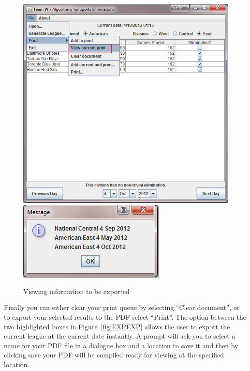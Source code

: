 \begin{figure}
\includegraphics[width=\linewidth,height=\measurepage,keepaspectratio]{images/userManualDesk11.png}
\includegraphics{images/userManualDesk12.png}
\caption{Viewing information to be exported}\label{fig:EXPVIEW}
\end{figure}

Finally you can either clear your print queue by selecting ``Clear document'', or
to export your selected results to the PDF select ``Print''. The
option between the two highlighted boxes in Figure~\ref{fig:EXPEXP}
allows the user to export the current league at the current date
instantly. A prompt will ask you to select a name for your PDF file in a dialogue box and a
location to save it and then by clicking save your PDF will be compiled ready
for viewing at the specified location.

